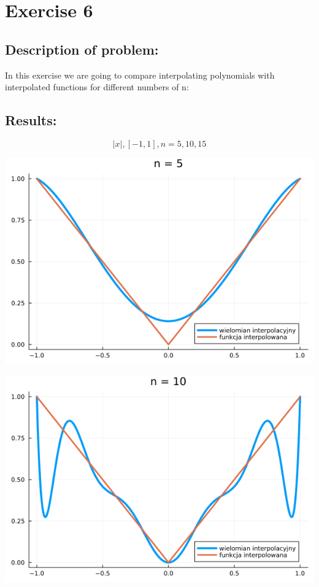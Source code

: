 \documentclass{article}
\begin{document}
\section*{Exercise 6}
\subsection*{Description of problem:}
In this exercise we are going to compare interpolating polynomials with interpolated functions for different numbers of n:


\subsection*{Results:}

\[
    |x|, [-1, 1], n = 5, 10, 15
\]

\begin{center}
    \includegraphics[scale=0.34]{6a_5.png}
\end{center}
\begin{center}
    \includegraphics[scale=0.34]{6a_10.png}
\end{center}
\end{document}
